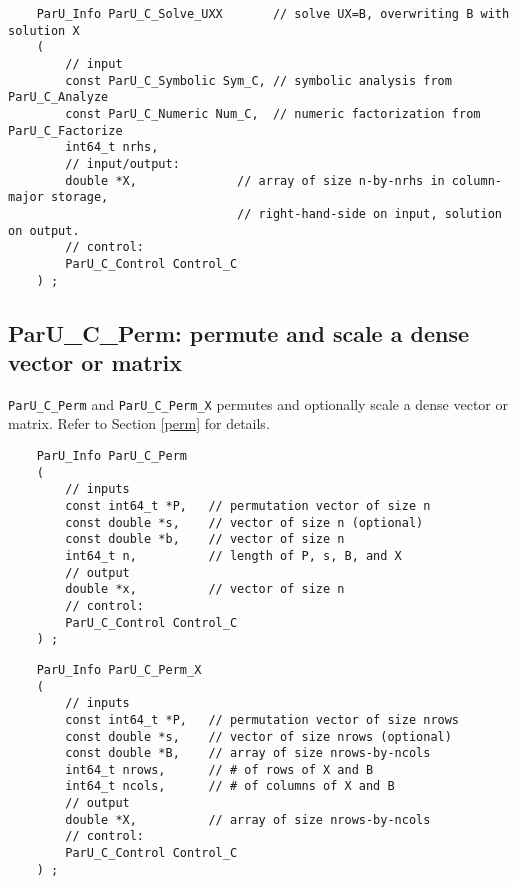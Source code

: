 \documentclass[12pt]{article}
\begin{document}
    {\footnotesize
    \begin{verbatim}
    ParU_Info ParU_C_Solve_UXX       // solve UX=B, overwriting B with solution X
    (
        // input
        const ParU_C_Symbolic Sym_C, // symbolic analysis from ParU_C_Analyze
        const ParU_C_Numeric Num_C,  // numeric factorization from ParU_C_Factorize
        int64_t nrhs,
        // input/output:
        double *X,              // array of size n-by-nrhs in column-major storage,
                                // right-hand-side on input, solution on output.
        // control:
        ParU_C_Control Control_C
    ) ; \end{verbatim} }

\subsection{{\sf ParU\_C\_Perm}: permute and scale a dense vector or matrix}

    \verb'ParU_C_Perm' and \verb'ParU_C_Perm_X' permutes and optionally scale a
    dense vector or matrix.  Refer to Section \ref{perm} for details.

    {\footnotesize
    \begin{verbatim}
    ParU_Info ParU_C_Perm
    (
        // inputs
        const int64_t *P,   // permutation vector of size n
        const double *s,    // vector of size n (optional)
        const double *b,    // vector of size n
        int64_t n,          // length of P, s, B, and X
        // output
        double *x,          // vector of size n
        // control:
        ParU_C_Control Control_C
    ) ; \end{verbatim} }

    {\footnotesize
    \begin{verbatim}
    ParU_Info ParU_C_Perm_X
    (
        // inputs
        const int64_t *P,   // permutation vector of size nrows
        const double *s,    // vector of size nrows (optional)
        const double *B,    // array of size nrows-by-ncols
        int64_t nrows,      // # of rows of X and B
        int64_t ncols,      // # of columns of X and B
        // output
        double *X,          // array of size nrows-by-ncols
        // control:
        ParU_C_Control Control_C
    ) ; \end{verbatim} }

\end{document}
